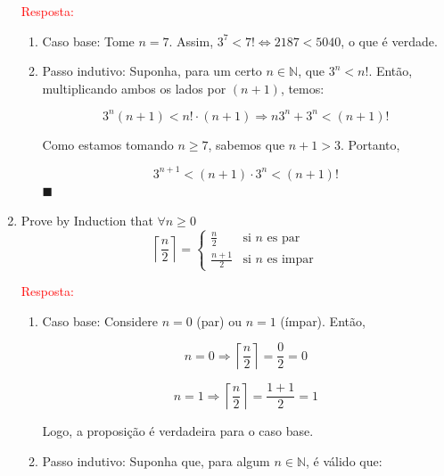 \documentclass{article}
\newcommand*{\QEDA}{\hfill\ensuremath{\blacksquare}}%
\begin{document}
\begin{enumerate}
  \textcolor{red}{Resposta: }
    \begin{enumerate}[itemsep=0pt, label=(\roman*)]
    
    \item Caso base: Tome $n=7$. Assim, $3^7<7! \iff 2187 < 5040$, o que é verdade.
    
    \item Passo indutivo: Suponha, para um certo $n \in \mathbb{N}$, que $3^n <n!$. Então, multiplicando ambos os lados por $(n+1)$, temos:
    
    \begin{equation*}
        3^n (n+1) < n! \cdot (n+1) \Rightarrow{} n3^n + 3^n < (n+1)!
    \end{equation*}
    
    Como estamos tomando $n \geq 7$, sabemos que $n+1>3$. Portanto, 
    
    \begin{equation*}
        3^{n+1} < (n+1)\cdot 3^n < (n+1)!
    \end{equation*}
     \QEDA
    \end{enumerate}
  
  
  \item Prove by Induction that $\forall n \geq 0$
  \[
    \left \lceil\frac{n}{2} \right \rceil=
    \left\{
    \begin{array}{ll}
    \frac{n}{2}& \textrm{si $n$ es par}\\
    \frac{n+1}{2}& \textrm{si $n$ es impar}
    \end{array}
    \right.
  \]
  
    \textcolor{red}{Resposta: }
    \begin{enumerate}[itemsep=0pt, label=(\roman*)]
    
    \item Caso base: Considere $n=0$ (par) ou $n=1$ (ímpar). Então, 
    
    \begin{equation*}
        n=0 \Rightarrow{} \left\lceil \frac{n}{2} \right \rceil = \frac{0}{2} = 0
    \end{equation*}
    
    \begin{equation*}
        n=1 \Rightarrow{} \left \lceil \frac{n}{2} \right \rceil = \frac{1+1}{2} = 1
    \end{equation*}
    
    Logo, a proposição é verdadeira para o caso base.
    
    \item Passo indutivo: Suponha que, para algum $n \in \mathbb{N}$, é válido que:
    

\end{enumerate}
\end{enumerate}
\end{document}
